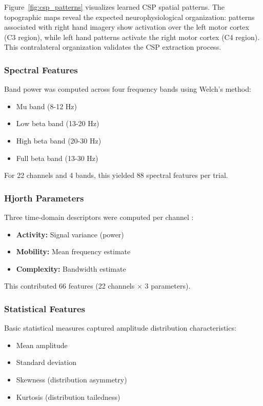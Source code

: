 \documentclass[11pt]{article}
\begin{document}
Figure~\ref{fig:csp_patterns} visualizes learned CSP spatial patterns. The topographic maps reveal the expected neurophysiological organization: patterns associated with right hand imagery show activation over the left motor cortex (C3 region), while left hand patterns activate the right motor cortex (C4 region). This contralateral organization validates the CSP extraction process.

\subsubsection{Spectral Features}

Band power was computed across four frequency bands using Welch's method:

\begin{itemize}
    \item Mu band (8-12 Hz)
    \item Low beta band (13-20 Hz)
    \item High beta band (20-30 Hz)
    \item Full beta band (13-30 Hz)
\end{itemize}

For 22 channels and 4 bands, this yielded 88 spectral features per trial.

\subsubsection{Hjorth Parameters}

Three time-domain descriptors were computed per channel \citep{hjorth1970eeg}:

\begin{itemize}
    \item \textbf{Activity:} Signal variance (power)
    \item \textbf{Mobility:} Mean frequency estimate
    \item \textbf{Complexity:} Bandwidth estimate
\end{itemize}

This contributed 66 features (22 channels × 3 parameters).

\subsubsection{Statistical Features}

Basic statistical measures captured amplitude distribution characteristics:

\begin{itemize}
    \item Mean amplitude
    \item Standard deviation
    \item Skewness (distribution asymmetry)
    \item Kurtosis (distribution tailedness)
\end{itemize}
\end{document}
